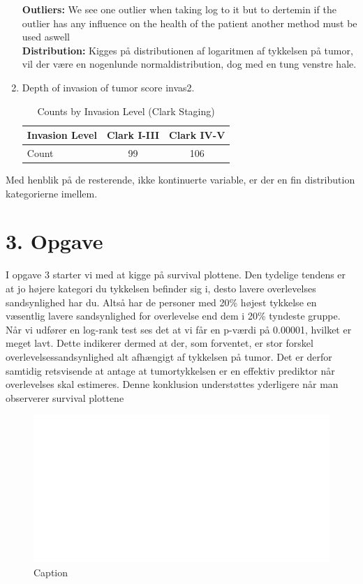 \begin{enumerate}
\begin{figure}[h]
\begin{subfigure}[b]{0.49\textwidth}
    \end{subfigure}
\end{figure}
\textbf{Outliers: }We see one outlier when taking log to it but to dertemin if the outlier has any influence on the health of the patient another method must be used aswell\\
\textbf{Distribution: }Kigges på distributionen af logaritmen af tykkelsen på tumor, vil der være en nogenlunde normaldistribution, dog med en tung venstre hale.
\item Depth of invasion of tumor score invas2.
\begin{table}[h!]
    \centering
    \begin{tabular}{|l|c|c|}
        \hline
        Invasion Level & Clark I-III & Clark IV-V \\
        \hline
        Count & 99 & 106 \\
        \hline
    \end{tabular}
    \caption{Counts by Invasion Level (Clark Staging)}
    \label{tab:invasion_level}
\end{table}

\end{enumerate}

Med henblik på de resterende, ikke kontinuerte variable, er der en fin distribution kategorierne imellem.



\chapter{3. Opgave}
I opgave 3 starter vi med at kigge på survival plottene. Den tydelige tendens er at jo højere kategori du tykkelsen befinder sig i, desto lavere overlevelses sandsynlighed har du. Altså har de personer med 20\% højest tykkelse en væsentlig lavere sandsynlighed for overlevelse end dem i 20\% tyndeste gruppe.\\
Når vi udfører en log-rank test ses det at vi får en p-værdi på 0.00001, hvilket er meget lavt. Dette indikerer dermed at der, som forventet, er stor forskel overlevelsessandsynlighed alt afhængigt af tykkelsen på tumor. Det er derfor samtidig retsvisende at antage at tumortykkelsen er en effektiv prediktor når overlevelses skal estimeres. Denne konklusion understøttes yderligere når man observerer survival plottene
\newpage
\begin{figure}[h]
    \centering
    \includegraphics[width=0.7\linewidth]{Basses_kode/Billeder_duration/Kaplan-Meier_Survival_Curves_by_Tumor_Thickness_Categories.pdf}
    \caption{Caption}
    \label{fig:enter-label}
\end{figure}


